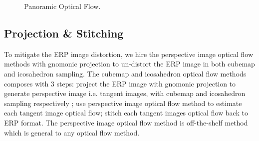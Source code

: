\begin{figure}[hbt!]
	\begin{center}
	\end{center}
	\caption{\label{fig:app:warparound}
		Panoramic Optical Flow.}
\end{figure}


\subsection{Projection \& Stitching}
\label{sec:approach:projstit}

To mitigate the ERP image distortion, we hire the perspective image optical flow methods with gnomonic projection to un-distort the ERP image in both cubemap and icosahedron sampling.
The cubemap and icosahedron optical flow methods composes with 3 steps:
project the ERP image with gnomonic projection \cite{?} to generate perspective image i.e. tangent images, with cubemap and icosahedron sampling respectively \cite{?}\cite{?};
use perspective image optical flow method to estimate each tangent image optical flow;
stitch each tangent images optical flow back to ERP format.
The perspective image optical flow method is off-the-shelf method which is general to any optical flow method.

